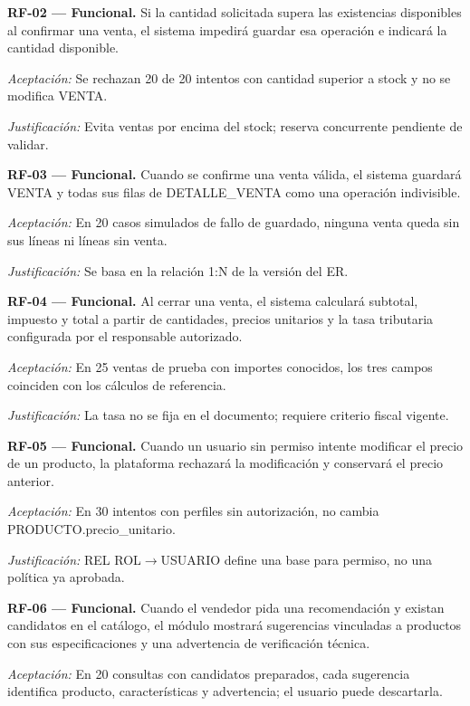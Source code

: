 \noindent\textbf{RF-02 — Funcional.} Si la cantidad solicitada supera las existencias disponibles al confirmar una venta, el sistema impedirá guardar esa operación e indicará la cantidad disponible.\par
\noindent\textit{Aceptación:} Se rechazan 20 de 20 intentos con cantidad superior a stock y no se modifica VENTA.\par
\noindent\textit{Justificación:} Evita ventas por encima del stock; reserva concurrente pendiente de validar.\par\medskip
\noindent\textbf{RF-03 — Funcional.} Cuando se confirme una venta válida, el sistema guardará VENTA y todas sus filas de DETALLE\_VENTA como una operación indivisible.\par
\noindent\textit{Aceptación:} En 20 casos simulados de fallo de guardado, ninguna venta queda sin sus líneas ni líneas sin venta.\par
\noindent\textit{Justificación:} Se basa en la relación 1:N de la versión del ER.\par\medskip
\noindent\textbf{RF-04 — Funcional.} Al cerrar una venta, el sistema calculará subtotal, impuesto y total a partir de cantidades, precios unitarios y la tasa tributaria configurada por el responsable autorizado.\par
\noindent\textit{Aceptación:} En 25 ventas de prueba con importes conocidos, los tres campos coinciden con los cálculos de referencia.\par
\noindent\textit{Justificación:} La tasa no se fija en el documento; requiere criterio fiscal vigente.\par\medskip
\noindent\textbf{RF-05 — Funcional.} Cuando un usuario sin permiso intente modificar el precio de un producto, la plataforma rechazará la modificación y conservará el precio anterior.\par
\noindent\textit{Aceptación:} En 30 intentos con perfiles sin autorización, no cambia PRODUCTO.precio\_unitario.\par
\noindent\textit{Justificación:} REL ROL$\rightarrow$USUARIO define una base para permiso, no una política ya aprobada.\par\medskip
\noindent\textbf{RF-06 — Funcional.} Cuando el vendedor pida una recomendación y existan candidatos en el catálogo, el módulo mostrará sugerencias vinculadas a productos con sus especificaciones y una advertencia de verificación técnica.\par
\noindent\textit{Aceptación:} En 20 consultas con candidatos preparados, cada sugerencia identifica producto, características y advertencia; el usuario puede descartarla.\par

